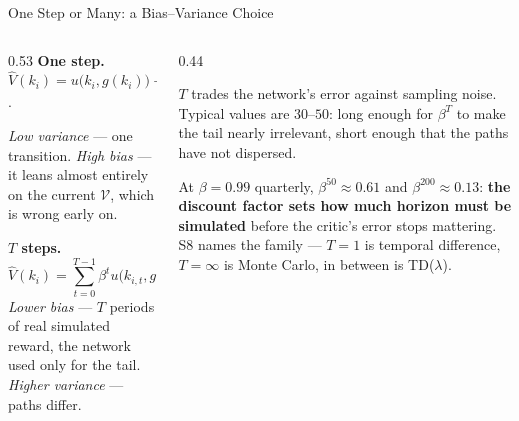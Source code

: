 \begin{frame}{One Step or Many: a Bias--Variance Choice}
\begin{columns}[T]
\begin{column}{0.53\textwidth}
\small
\textbf{One step.} $\hat V(k_i)=u\bigl(k_i,g(k_i)\bigr)+\beta\,\mathcal{V}(k_{i,1})$.
\smallskip

\emph{Low variance} --- one transition. \emph{High bias} --- it leans almost entirely on the current $\mathcal{V}$, which is wrong early on.
\smallskip

\textbf{$T$ steps.}
\[
  \hat V(k_i)=\sum_{t=0}^{T-1}\beta^{t}u\bigl(k_{i,t},g(k_{i,t})\bigr)+\beta^{T}\mathcal{V}(k_{i,T}).
\]
\emph{Lower bias} --- $T$ periods of real simulated reward, the network used only for the tail. \emph{Higher variance} --- paths differ.
\end{column}
\begin{column}{0.44\textwidth}
\begin{takeawaybox}[title=\textbf{The dial}]\small
$T$ trades the network's error against sampling noise. Typical values are $30$--$50$: long enough for $\beta^{T}$ to make the tail nearly irrelevant, short enough that the paths have not dispersed.
\end{takeawaybox}
\smallskip
{\footnotesize At $\beta=0.99$ quarterly, $\beta^{50}\approx0.61$ and $\beta^{200}\approx0.13$: \textbf{the discount factor sets how much horizon must be simulated} before the critic's error stops mattering.
\medskip
S8 names the family --- $T=1$ is temporal difference, $T=\infty$ is Monte Carlo, in between is TD($\lambda$).}
\end{column}
\end{columns}
\end{frame}


